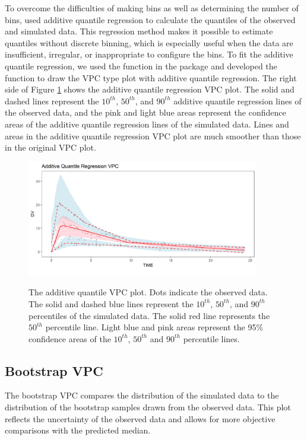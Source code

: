 To overcome the difficulties of making bins as well as determining the number of bins,
\cite{jamsen2018regression} used additive quantile regression to calculate the quantiles of the observed and simulated data. This regression method makes it possible to estimate quantiles without discrete binning, which is especially useful when the data are insufficient, irregular, or inappropriate to configure the bins. To fit the additive quantile regression, we used  the  function in the  \citep{quantreg} package and developed the  function to draw the VPC type plot with additive quantile regression. The right side of Figure \ref{Fig1} shows the additive quantile regression VPC plot. The solid and dashed lines represent the $10^{th}$, $50^{th}$, and $90^{th}$ additive quantile regression lines of the observed data, and the pink and light blue areas represent the confidence areas of the additive quantile regression lines of the simulated data. Lines and areas in the additive quantile regression VPC plot are much smoother than those in the original VPC plot.

\begin{figure}
\caption{The additive quantile VPC plot.  Dots indicate the observed data. The solid and dashed blue lines represent the $10^{th}$, $50^{th}$, and $90^{th}$ percentiles of the simulated data. The solid red line represents the $50^{th}$ percentile line. Light blue and pink areas represent the 95\% confidence areas of the $10^{th}$, $50^{th}$ and $90^{th}$ percentile lines.}
\centering
\includegraphics[width=4in,height=2in]{plotPNG/Fig1-1.png}
\label{Fig1}
\end{figure}



\hypertarget{bootVPC}{%
\subsection{Bootstrap VPC}\label{bootVPC}}

The bootstrap VPC \citep{post2008extensions} compares the distribution of the simulated data to the distribution of the bootstrap samples drawn from the observed data.
This plot reflects the uncertainty of the observed data and allows for more objective comparisons with the predicted median.

